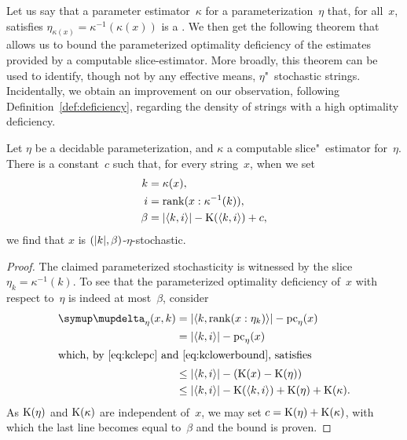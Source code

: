 Let us say that a parameter estimator~$\kappa$ for a parameterization~$\eta$ that, for all~$x$, satisfies $\eta_{\kappa(x)} = \kappa^{-1}(\kappa(x))$ is a .
We then get the following theorem that allows us to bound the parameterized optimality deficiency of the estimates provided by a computable slice-estimator.
More broadly, this theorem can be used to identify, though not by any effective means, $\eta$"~stochastic strings.
Incidentally, we obtain an improvement on our observation, following Definition~\ref{def:deficiency}, regarding the density of strings with a high optimality deficiency.
\begin{theorem}
\label{thm:etastochastic}%
  Let $\eta$ be a decidable parameterization, and $\kappa$ a computable slice"~estimator for~$\eta$.
  There is a constant~$c$ such that, for every string~$x$, when we set
  \begin{align*}
    k &= \kappa(x), \\
    i &= \operatorname{rank}(x : \kappa^{-1}(k)), \\
    \beta &= {\lvert{\langle k, i\rangle}\rvert} - \operatorname{K}({\langle k, i\rangle}) + c,
  \end{align*}
  we find that $x$ is $({\lvert k\rvert}, \beta)$-$\eta$-stochastic.
\end{theorem}
\begin{proof}
  The claimed parameterized stochasticity is witnessed by the slice $\eta_k = \kappa^{-1}(k)$.
  To see that the parameterized optimality deficiency of~$x$ with respect to~$\eta$ is indeed at most~$\beta$, consider
  \begin{align*}
    \updelta_\eta(x, k) &= \length{\pair{k}{\rank(x : \eta_k)}} - \pc_\eta(x) \\
      &= \length{\pair{k}{i}} - \pc_\eta(x) \\
    \intertext{which, by~\eqref{eq:kclepc} and~\eqref{eq:kclowerbound}, satisfies}
      &\le \length{\pair{k}{i}} - (\KC(x) - \KC(\eta)) \\
      &\le \length{\pair{k}{i}} - \KC(\pair{k}{i}) + \KC(\eta) + \KC(\kappa).
  \end{align*}
  As $\operatorname{K}(\eta)$ and $\operatorname{K}(\kappa)$ are independent of~$x$, we may set $c = \operatorname{K}(\eta) + \operatorname{K}(\kappa)$, with which the last line becomes equal to~$\beta$ and the bound is proven.
\end{proof}

